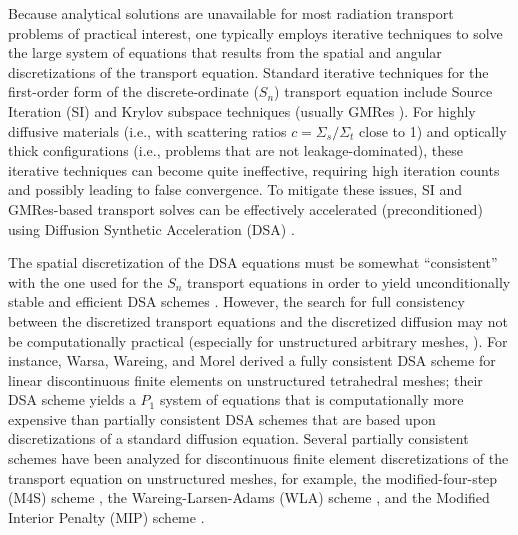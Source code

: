 \documentclass[preprint,10pt]{elsarticle}
\renewcommand{\(}{\left(}
\renewcommand{\)}{\right)}
\renewcommand{\[}{\left[}
\renewcommand{\]}{\right]}
\newcommand{\sn}{\ensuremath{S_n}\xspace}
\begin{document}
Because analytical solutions are unavailable for most
radiation transport problems of practical interest, one typically employs
iterative techniques to solve the large system of equations that results from
the spatial and angular discretizations of the transport equation. Standard
iterative techniques for the first-order form of the discrete-ordinate (\sn)
transport equation include Source Iteration (SI)  and Krylov 
subspace techniques (usually GMRes \cite{gmres}). For highly diffusive materials 
(i.e., with scattering ratios $c=\Sigma_s / \Sigma_t $ close to 1) and optically 
thick configurations (i.e., problems that are not leakage-dominated), these iterative techniques 
can become quite ineffective, requiring high iteration counts and possibly 
leading to false convergence. To mitigate these issues, SI and GMRes-based transport solves 
can be effectively accelerated (preconditioned) using Diffusion Synthetic Acceleration (DSA) 
\cite{dsa_ref,larsen_dsa,consistent_p1,m4s,wla,mip}. 

The spatial discretization of the DSA equations
must be somewhat ``consistent'' with the one used for the \sn transport equations 
in order to yield unconditionally stable and efficient DSA schemes
\cite{dsa_ref,larsen_dsa,consistent_p1,m4s,wla,mip}. However, the search for full
consistency between the discretized transport equations and the discretized
diffusion may not be computationally practical (especially for unstructured
arbitrary meshes, \cite{dsa_ref}). For instance, Warsa, Wareing, and
Morel \cite{consistent_p1} derived a fully consistent DSA scheme for linear
discontinuous finite elements on unstructured tetrahedral meshes; their DSA
scheme yields a $P_1$ system of equations that is
computationally more expensive than partially consistent DSA schemes that are
based upon discretizations of a standard diffusion equation. Several partially 
consistent schemes have been analyzed for discontinuous finite element
discretizations of the transport equation on unstructured meshes, for
example, the modified-four-step (M4S) scheme \cite{m4s}, the
Wareing-Larsen-Adams (WLA) scheme \cite{wla}, and the Modified Interior
Penalty (MIP) scheme \cite{mip}.

\end{document}

